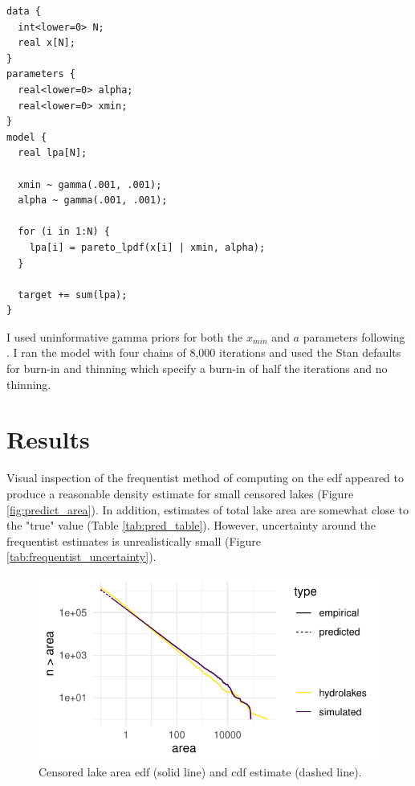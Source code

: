 \documentclass{article}
\begin{document}
\begin{minipage}[c]{0.95\textwidth}
	\begin{lstlisting}
data {
  int<lower=0> N;
  real x[N];
}
parameters {
  real<lower=0> alpha;
  real<lower=0> xmin;
}
model {
  real lpa[N];

  xmin ~ gamma(.001, .001);
  alpha ~ gamma(.001, .001);

  for (i in 1:N) {
    lpa[i] = pareto_lpdf(x[i] | xmin, alpha);
  }

  target += sum(lpa);
}
\end{lstlisting}
\end{minipage}

I used uninformative gamma priors for both the $x_{min}$ and $a$ parameters following \citet{scollnikCompositeLognormalParetoModels2007}. I ran the model with four chains of 8,000 iterations and used the Stan defaults for burn-in and thinning which specify a burn-in of half the iterations and no thinning.

\section{Results}

Visual inspection of the frequentist method of computing on the edf appeared to produce a reasonable density estimate for small censored lakes (Figure \ref{fig:predict_area}). In addition, estimates of total lake area are somewhat close to the "true" value (Table \ref{tab:pred_table}). However, uncertainty around the frequentist estimates is unrealistically small (Figure \ref{tab:frequentist_uncertainty}).

\begin{figure}
	\centering
	\includegraphics{figures/predict_censor-1}
	\caption{Censored lake area edf (solid line) and cdf estimate (dashed line).}
	\label{fig:predict_censor}
\end{figure}
\end{document}

